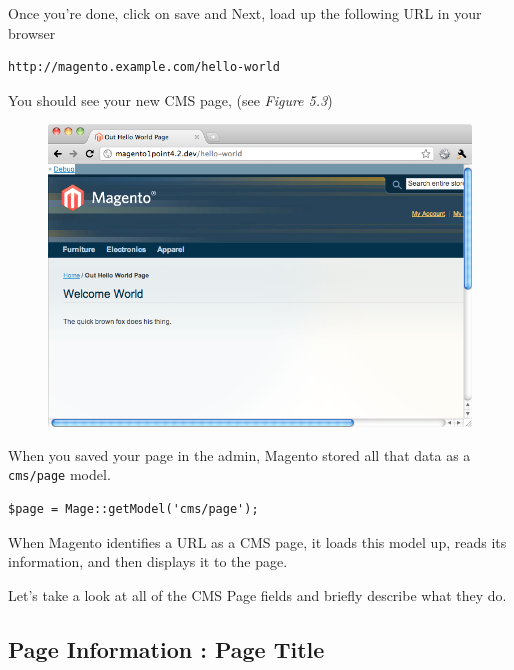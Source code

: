 \documentclass[oneside]{book}
\begin{document}
Once you're done, click on save and Next, load up the following URL in your browser

\begin{lstlisting}
http://magento.example.com/hello-world

\end{lstlisting}


You should see your new CMS page, (see \emph{Figure 5.3}) 

\begin{figure}[htb]
\begin{center}
\leavevmode
\includegraphics[width=1\textwidth]{images/chapter6/page1.png}
\end{center}
\caption{}
\end{figure}


When you saved your page in the admin, Magento stored all that data as a \footnotesize\texttt{cms/page} \normalsize  model.  

\begin{lstlisting}
$page = Mage::getModel('cms/page');

\end{lstlisting}


When Magento identifies a URL as a CMS page, it loads this model up, reads its information, and then displays it to the page.

Let's take a look at all of the CMS Page fields and briefly describe what they do.

\subsection{Page Information : Page Title}
\end{document}
